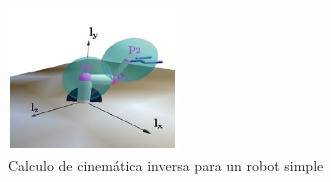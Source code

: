 \begin{figure}[!htb]
	\centering
	\includegraphics[width=0.4\textwidth]{01Introduccion/imagenes/ejemplo.jpg}
	\caption{Calculo de cinemática inversa para un robot simple} 
	\label{fig:ejemplo}
\end{figure}

